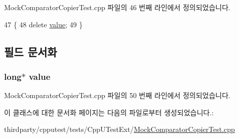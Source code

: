 Mock\+Comparator\+Copier\+Test.\+cpp 파일의 46 번째 라인에서 정의되었습니다.


\begin{DoxyCode}
47     \{
48         \textcolor{keyword}{delete} \hyperlink{class_my_type_for_testing_ab6f550787dc33592efb2fcb6596fdd0f}{value};
49     \}
\end{DoxyCode}


\subsection{필드 문서화}
\subsubsection[{\texorpdfstring{value}{value}}]{\setlength{\rightskip}{0pt plus 5cm}long$\ast$ value}\hypertarget{class_my_type_for_testing_ab6f550787dc33592efb2fcb6596fdd0f}{}\label{class_my_type_for_testing_ab6f550787dc33592efb2fcb6596fdd0f}


Mock\+Comparator\+Copier\+Test.\+cpp 파일의 50 번째 라인에서 정의되었습니다.



이 클래스에 대한 문서화 페이지는 다음의 파일로부터 생성되었습니다.\+:\begin{DoxyCompactItemize}
\item 
thirdparty/cpputest/tests/\+Cpp\+U\+Test\+Ext/\hyperlink{_mock_comparator_copier_test_8cpp}{Mock\+Comparator\+Copier\+Test.\+cpp}\end{DoxyCompactItemize}
